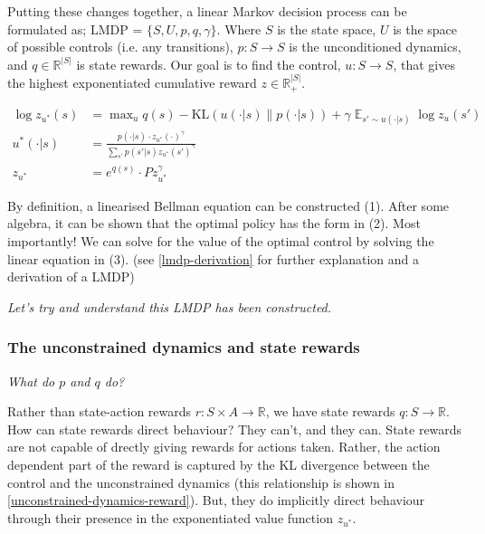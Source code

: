 

Putting these changes together, a linear Markov decision process can be formulated as;
LMDP = $\{S, U, p, q, \gamma\}$. Where $S$ is the state space, $U$ is the space of possible controls (i.e. any transitions),
$p: S \to S$ is the unconditioned dynamics, and $q \in \mathbb R^{|S|}$ is state rewards.
Our goal is to find the control, $u: S \to S$, that gives the highest exponentiated cumulative reward $z \in \mathbb R_+^{|S|}$.

\begin{align}
\log z_{u^{* }}(s) &= \mathop{\text{max}}_{u} q(s) - \text{KL}(u(\cdot| s) \parallel p(\cdot | s)) + \gamma \mathop{\mathbb E}_{s' \sim u(\cdot | s)} \log z_{u}(s') \tag{1}\\
u^{* }(\cdot | s) &= \frac{p(\cdot | s)\cdot z_{u^{* }}(\cdot)^{\gamma}}{\sum_{s'} p(s' | s) z_{u^{* }}(s')^{\gamma}} \tag{2}\\
z_{u^{* }} &= e^{q(s)}\cdot P z_{u^{* }}^{\gamma} \tag{3}
\end{align}

By definition, a linearised Bellman equation can be constructed (1). After some algebra,
it can be shown that the optimal policy has the form in (2).
Most importantly! We can solve for the value of the optimal control by solving the linear equation in (3).
(see \ref{lmdp-derivation} for further explanation and a derivation of a LMDP)

\begin{displayquote}
\textsl{Let's try and understand this LMDP has been constructed.}
\end{displayquote}

\subsubsection{The unconstrained dynamics and state rewards}

\begin{displayquote}
\textsl{What do $p$ and $q$ do?}
\end{displayquote}

Rather than state-action rewards $r: S \times A \to \mathbb R$, we have state rewards $q: S \to \mathbb R$.
How can state rewards direct behaviour? They can't, and they can. State rewards are not capable of drectly giving rewards for actions taken.
Rather, the action dependent part of the reward is captured by the KL divergence between
the control and the unconstrained dynamics (this relationship is shown in \ref{unconstrained-dynamics-reward}).
But, they do implicitly direct behaviour through their presence in the exponentiated value function $z_{u^{* }}$.

